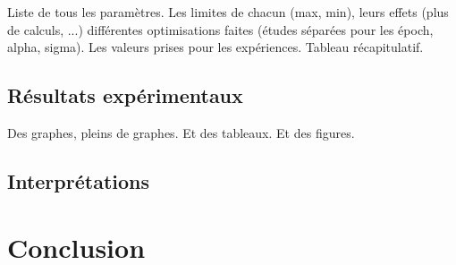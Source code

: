 	Liste de tous les paramètres. Les limites de chacun (max, min), leurs effets (plus de calculs, ...) différentes optimisations faites (études séparées pour les époch, alpha, sigma). Les valeurs prises pour les expériences. Tableau récapitulatif.

	\subsection{Résultats expérimentaux}

	Des graphes, pleins de graphes. Et des tableaux. Et des figures.

	\subsection{Interprétations}

	

	\section{Conclusion}
		

